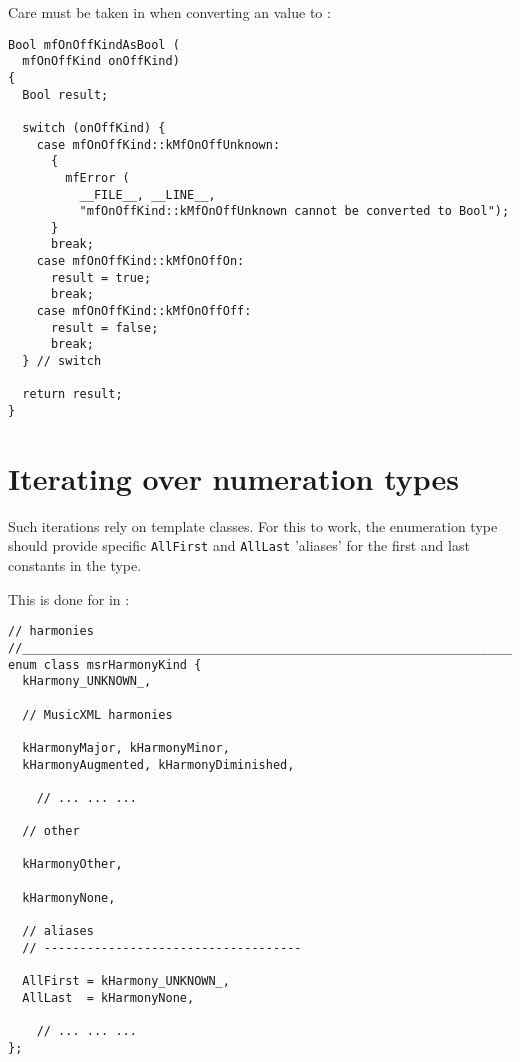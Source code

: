 Care must be taken in  when converting an  value to :
\begin{lstlisting}[language=Terminal]
Bool mfOnOffKindAsBool (
  mfOnOffKind onOffKind)
{
  Bool result;

  switch (onOffKind) {
    case mfOnOffKind::kMfOnOffUnknown:
      {
        mfError (
          __FILE__, __LINE__,
          "mfOnOffKind::kMfOnOffUnknown cannot be converted to Bool");
      }
      break;
    case mfOnOffKind::kMfOnOffOn:
      result = true;
      break;
    case mfOnOffKind::kMfOnOffOff:
      result = false;
      break;
  } // switch

  return result;
}
\end{lstlisting}


\section{Iterating over numeration types}

Such iterations rely on template classes. For this to work, the enumeration type should provide specific {\tt AllFirst} and {\tt AllLast} 'aliases' for the first and last constants in the type.

This is done for  in :
\begin{lstlisting}[language=CPlusPlus]
// harmonies
//______________________________________________________________________________
enum class msrHarmonyKind {
  kHarmony_UNKNOWN_,

  // MusicXML harmonies

  kHarmonyMajor, kHarmonyMinor,
  kHarmonyAugmented, kHarmonyDiminished,

	// ... ... ...

  // other

  kHarmonyOther,

  kHarmonyNone,

  // aliases
  // ------------------------------------

  AllFirst = kHarmony_UNKNOWN_,
  AllLast  = kHarmonyNone,

	// ... ... ...
};
\end{lstlisting}

